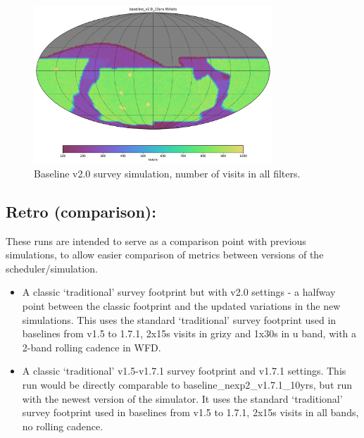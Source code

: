 \begin{figure}[htbp]
\begin{center}
\includegraphics[width=0.8\textwidth]{baseline_v2_0_10yrs_Nvisits_HEAL_SkyMap}
\caption{Baseline v2.0 survey simulation, number of visits in all filters.}
\label{fig:baseline_v2.0_footprint}
\end{center}
\end{figure}



\subsection{Retro (comparison):}
These runs are intended to serve as a comparison point with previous simulations, to allow easier comparison of metrics between versions of the scheduler/simulation.
\begin{itemize} 
\item A classic ‘traditional’ survey footprint but with v2.0 settings - a halfway point between the classic footprint and the updated variations in the new simulations. This uses the standard ‘traditional’ survey footprint used in baselines from v1.5 to 1.7.1, 2x15s visits in grizy and 1x30s in u band, with a 2-band rolling cadence in WFD.
\item A classic ‘traditional’ v1.5-v1.7.1 survey footprint and v1.7.1 settings. This run would be directly comparable to baseline\_nexp2\_v1.7.1\_10yrs, but run with the newest version of the simulator. It uses the standard ‘traditional’ survey footprint used in baselines from v1.5 to 1.7.1, 2x15s visits in all bands, no rolling cadence.
\end{itemize}

